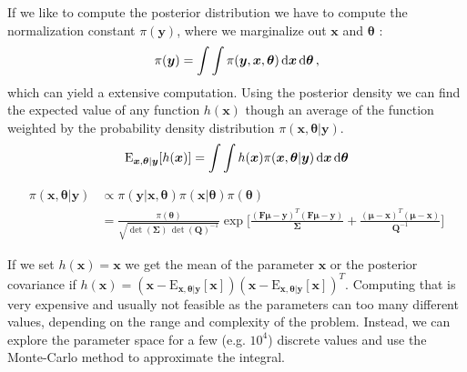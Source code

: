 If we like to compute the posterior distribution we have to compute the normalization constant $\pi(\bm{y})$, where we marginalize out $\bm{x}$ and $\bm{\theta}$ :
\begin{equation}
    \pi(\bm{y}) = \int \int \pi(\bm{y}, \bm{x}, \bm{\theta}) \mathop{}\!\mathrm{d} \bm{x} \mathop{}\!\mathrm{d} \bm{\theta} \, ,
\end{equation}
which can yield a extensive computation.
Using the posterior density we can find the expected value of any function $h(\bm{x})$ though an average of the function weighted by the probability density distribution $\pi (\bm{x} , \bm{\theta} | \bm{y})$.
\begin{equation}
    \text{E}_{\bm{x},\bm{\theta}|\bm{y}} [h(\bm{x})] = \int \int h(\bm{x}) \pi( \bm{x}, \bm{\theta} | \bm{y}) \mathop{}\!\mathrm{d} \bm{x} \mathop{}\!\mathrm{d} \bm{\theta} 
\end{equation}

\begin{align}
    \pi(\bm{x}, \bm{\theta} | \bm{y}) &\propto  \pi(\bm{y}|  \bm{x}, \bm{\theta} )  \pi(\bm{x}|  \bm{\theta} )  \pi(\bm{\theta} ) \\
    &= \frac{  \pi(\bm{\theta})}{\sqrt{ \det( \bm{\Sigma}) \,  \det( \bm{Q} )^{-1}  } } \exp{ \Bigg[  \frac{(\bm{F \mu} - \bm{y})^T  (\bm{F \mu} - \bm{y})}{\bm{\Sigma}} + \frac{(\bm{\mu} - \bm{x})^T  (\bm{\mu} - \bm{x}) }{\bm{Q}^{-1}}\Bigg] }
\end{align}

If we set $h(\bm{x}) = \bm{x}$ we get the mean of the parameter $\bm{x}$ or the posterior covariance if $h(\bm{x}) = (\bm{x} - \text{E}_{\bm{x},\bm{\theta}|\bm{y}} [\bm{x}]) (\bm{x} - \text{E}_{\bm{x},\bm{\theta}|\bm{y}} [\bm{x}] )^T $.
Computing that is very expensive and usually not feasible as the parameters can too many different values, depending on the range and complexity of the problem.
Instead, we can explore the parameter space for a few (e.g. $10^4$) discrete values and use the Monte-Carlo method to approximate the integral.


